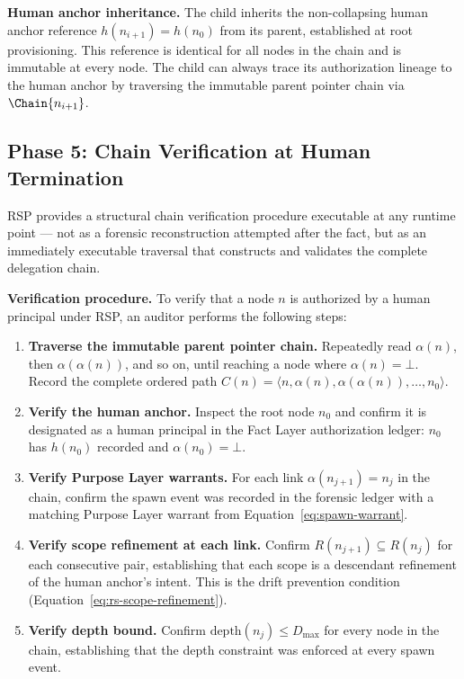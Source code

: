 \medskip
\noindent\textbf{Human anchor inheritance.} The child inherits the non-collapsing human anchor reference $h(n_{i+1}) = h(n_0)$ from its parent, established at root provisioning. This reference is identical for all nodes in the chain and is immutable at every node. The child can always trace its authorization lineage to the human anchor by traversing the immutable parent pointer chain via $\Chain{n_{i+1}}$.

\subsection{Phase 5: Chain Verification at Human Termination}
\label{sec:rs-phase5}

RSP provides a structural chain verification procedure executable at any runtime point — not as a forensic reconstruction attempted after the fact, but as an immediately executable traversal that constructs and validates the complete delegation chain.

\medskip
\noindent\textbf{Verification procedure.} To verify that a node $n$ is authorized by a human principal under RSP, an auditor performs the following steps:

\begin{enumerate}
    \item[(V1)] \textbf{Traverse the immutable parent pointer chain.} Repeatedly read $\alpha(n)$, then $\alpha(\alpha(n))$, and so on, until reaching a node where $\alpha(n) = \bot$. Record the complete ordered path $C(n) = \langle n, \alpha(n), \alpha(\alpha(n)), \ldots, n_0 \rangle$.

    \item[(V2)] \textbf{Verify the human anchor.} Inspect the root node $n_0$ and confirm it is designated as a human principal in the Fact Layer authorization ledger: $n_0$ has $h(n_0)$ recorded and $\alpha(n_0) = \bot$.

    \item[(V3)] \textbf{Verify Purpose Layer warrants.} For each link $\alpha(n_{j+1}) = n_j$ in the chain, confirm the spawn event was recorded in the forensic ledger with a matching Purpose Layer warrant from Equation~\ref{eq:spawn-warrant}.

    \item[(V4)] \textbf{Verify scope refinement at each link.} Confirm $R(n_{j+1}) \subseteq R(n_j)$ for each consecutive pair, establishing that each scope is a descendant refinement of the human anchor's intent. This is the drift prevention condition (Equation~\ref{eq:rs-scope-refinement}).

    \item[(V5)] \textbf{Verify depth bound.} Confirm $\text{depth}(n_j) \leq D_{\max}$ for every node in the chain, establishing that the depth constraint was enforced at every spawn event.
\end{enumerate}

